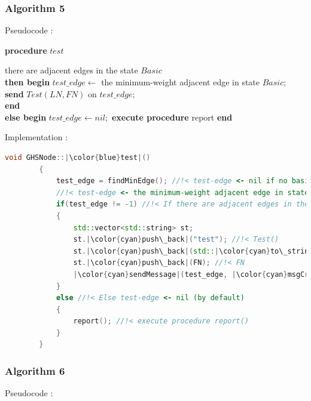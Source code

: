 \documentclass[letterpaper,11pt]{article}
\begin{document}
	
	\subsubsection{Algorithm 5}
	Pseudocode : \\
	
	\begin{tcolorbox}
		{\bf procedure} $test$
		\begin{algorithmic}
			 there are adjacent edges in the state $Basic$ \\
			{\quad \bf then begin } $test\_edge \leftarrow $ the minimum-weight adjacent edge in state $Basic$; \\
			{\quad \quad \quad \quad \quad \bf send} $Test(LN, FN)$ on $test\_edge$; \\
			{\qquad \qquad \bf end} \\
			{\bf else begin} $test\_edge \leftarrow nil;$ {\bf execute procedure } report {\bf end}
		\end{algorithmic}
	\end{tcolorbox}
	
	\bigskip 
	
	Implementation : 
	
	
	\begin{lstlisting}[language=C++, caption= test()]
		void GHSNode::|\color{blue}test|()
		{
			test_edge = findMinEdge(); //!< test-edge <- nil if no basic edges 
			//!< test-edge <- the minimum-weight adjacent edge in state Basic
			if(test_edge != -1) //!< If there are adjacent edges in the state Basic
			{
				std::vector<std::string> st;
				st.|\color{cyan}push\_back|("test"); //!< Test()
				st.|\color{cyan}push\_back|(std::|\color{cyan}to\_string|(LN)); //!< LN
				st.|\color{cyan}push\_back|(FN); //!< FN
				|\color{cyan}sendMessage|(test_edge, |\color{cyan}msgCreater|(st)); //!< send Test(LN, FN) on test-edge
			}
			else //!< Else test-edge <- nil (by default)
			{
				report(); //!< execute procedure report()
			}
		}
	\end{lstlisting}
	
	
	\subsubsection{Algorithm 6}
	Pseudocode : \\
	
\end{document}
